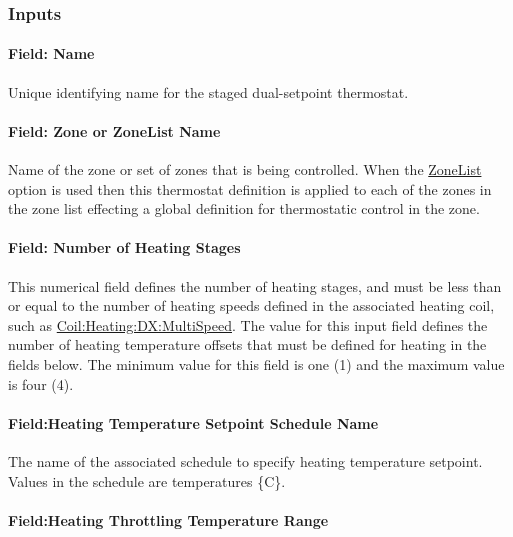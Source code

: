 \subsubsection{Inputs}\label{inputs-7-030}

\paragraph{Field: Name}\label{field-name-5-028}

Unique identifying name for the staged dual-setpoint thermostat.

\paragraph{Field: Zone or ZoneList Name}\label{field-zone-or-zonelist-name-1-001}

Name of the zone or set of zones that is being controlled. When the \hyperref[zonelist]{ZoneList} option is used then this thermostat definition is applied to each of the zones in the zone list effecting a global definition for thermostatic control in the zone.

\paragraph{Field: Number of Heating Stages}\label{field-number-of-heating-stages}

This numerical field defines the number of heating stages, and must be less than or equal to the number of heating speeds defined in the associated heating coil, such as \hyperref[coilheatingdxmultispeed]{Coil:Heating:DX:MultiSpeed}. The value for this input field defines the number of heating temperature offsets that must be defined for heating in the fields below. The minimum value for this field is one (1) and the maximum value is four (4).

\paragraph{Field:Heating Temperature Setpoint Schedule Name}\label{fieldheating-temperature-setpoint-schedule-name}

The name of the associated schedule to specify heating temperature setpoint. Values in the schedule are temperatures \{C\}.

\paragraph{Field:Heating Throttling Temperature Range}\label{fieldheating-throttling-temperature-range}

